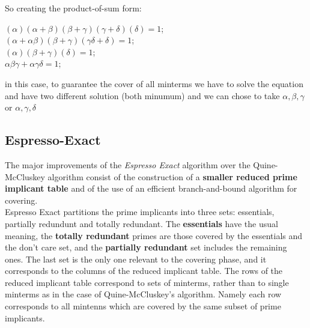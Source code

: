 So creating the product-of-sum form:\\
\begin{center}
	$(\alpha)(\alpha+\beta)(\beta+\gamma)(\gamma+\delta)(\delta) = 1$;\\
	$(\alpha+\alpha\beta)(\beta+\gamma)(\gamma\delta+\delta) = 1$;\\
	$(\alpha)(\beta+\gamma)(\delta) = 1$;\\
	$\alpha\beta\gamma + \alpha\gamma\delta = 1$;\\
\end{center}

in this case, to guarantee the cover of all minterms we have to solve the equation and have two different solution (both minumum) and we can chose to take $\alpha, \beta, \gamma$ or $\alpha, \gamma, \delta$


\subsection{Espresso-Exact}

The major improvements of the \textit{Espresso Exact} algorithm over the Quine-McCluskey algorithm consist of the construction of a \textbf{smaller reduced prime implicant table } and of the use of an efficient branch-and-bound algorithm for covering.\\

Espresso Exact partitions the prime implicants into three sets: essentials, partially redundunt and totally redundant. The \textbf{essentials} have the usual meaning, the \textbf{totally redundant} primes are those covered by the essentials and the don't care set, and the \textbf{partially redundant} set includes the remaining ones. The last set is the only one relevant to the covering phase, and it corresponds to the columns of the reduced implicant table. The rows of the reduced implicant table correspond to sets of minterms, rather than to single minterms as in the case of Quine-McCluskey's algorithm. Namely each row corresponds to all mintenns which are covered by the same subset of prime
implicants.
\bigskip 

